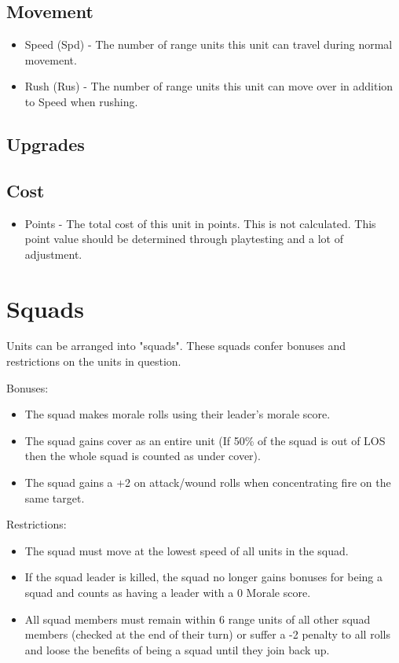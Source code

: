\documentclass{article}
\begin{document}
\subsection{Movement}
\begin{itemize}
	\item Speed (Spd) - The number of range units this unit can travel during normal movement.
	\item Rush (Rus) - The number of range units this unit can move over in addition to Speed when rushing.
\end{itemize}

\subsection{Upgrades}

\subsection{Cost}
\begin{itemize}
	\item Points - The total cost of this unit in points.  This is not calculated.  This point value should be determined through playtesting and a lot of adjustment.
\end{itemize}

\section{Squads}
Units can be arranged into "squads".  These squads confer bonuses and restrictions on the units in question.

Bonuses:
\begin{itemize}
	\item The squad makes morale rolls using their leader's morale score.
	\item The squad gains cover as an entire unit (If 50\% of the squad is out of LOS then the whole squad is counted as under cover).
	\item The squad gains a +2 on attack/wound rolls when concentrating fire on the same target.
\end{itemize}

Restrictions:
\begin{itemize}
	\item The squad must move at the lowest speed of all units in the squad.
	\item If the squad leader is killed, the squad no longer gains bonuses for being a squad and counts as having a leader with a 0 Morale score.
	\item All squad members must remain within 6 range units of all other squad members (checked at the end of their turn) or suffer a -2 penalty to all rolls and loose the benefits of being a squad until they join back up.
\end{itemize}
\end{document}
